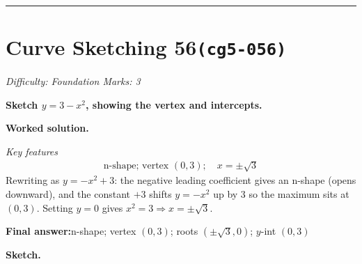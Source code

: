 \documentclass[11pt]{article}
\newcommand{\question}[1]{\par\medskip\noindent\textbf{#1}\par}
\begin{document}
\medskip\hrule

\section*{Curve Sketching 56\quad\small\texttt{(cg5-056)}}
\textit{Difficulty: Foundation \quad\textbar\quad Marks: 3}

\question{Sketch \( y = 3 - x^2 \), showing the vertex and intercepts.}

\textbf{Worked solution.}

\textit{Key features}
\[\begin{gathered}
\text{n-shape; vertex } (0,3); \quad x = \pm\sqrt{3}
\end{gathered}\]
Rewriting as \( y = -x^2 + 3 \): the negative leading coefficient gives an n-shape (opens downward), and the constant \(+3\) shifts \( y = -x^2 \) up by 3 so the maximum sits at \( (0,3) \). Setting \( y = 0 \) gives \( x^2 = 3 \Rightarrow x = \pm\sqrt{3} \).

\begin{answerbox}
\textbf{Final answer:}\quad n-shape; vertex \(\displaystyle (0,3)\); roots \(\displaystyle (\pm\sqrt{3}, 0)\); \(\displaystyle y\)-int \(\displaystyle (0,3)\)
\end{answerbox}
\textbf{Sketch.}
\end{document}
